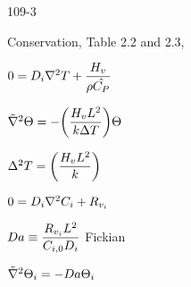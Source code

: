 \begin{mitframe}{109-3}
\begin{listone}
	\item Conservation, Table 2.2 and 2.3,
    	\begin{listtwo}
                	\item $0=\pdiff\nabla^2\Temp+\dfrac{\enthalpy_{\vvel}}{\dens\hat{\cp}}$
        		    \begin{listthree}
                    \item $\tilde{\nabla}^2\dimltemp=-\bigg(\dfrac{\enthalpy_{\vvel}\length^2}{\thermcond\iipf\Temp}\bigg)\dimltemp$
            		\item $\iipf^2\Temp=\bigg(\dfrac{\enthalpy_{\vvel}\length^2}{\thermcond}\bigg)$
            	\end{listthree}
        	\item $0=\pdiff\nabla^2\conc_{\state}+\gasconst_{\vvel_{\state}}$
            	\begin{listthree}
                	\item $\damkohler\equiv\dfrac{\gasconst_{\vvel_{\state}}\length^2}{\conc_{\state,\init}\pdiff}$ Fickian
                    \item $\tilde{\nabla}^2\dimltemp_{\state}=-\damkohler\dimltemp_{\state}$
                \end{listthree}
        \end{listtwo}
\end{listone}        
\end{mitframe}